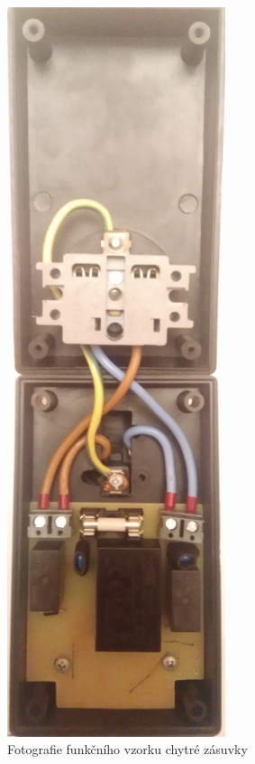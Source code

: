\documentclass[12pt,a4paper,oneside]{article}
\begin{document}
\begin{figure}[H]
\centering
\label{fig:foto/brana}
\includegraphics[width = 64mm]{../img/foto/zasuvka.jpg}
\caption{Fotografie funkčního vzorku chytré zásuvky}
\end{figure}

\newpage

\printindex[zkr]


\newpage
\end{document}
